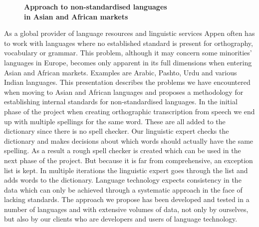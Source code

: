 \documentclass[10pt, a4paper, twopage, headinclude, footinclude, BCOR5mm]{book}
\begin{document}
\newpage

\begin{figure}[t!]
\centering
\large\textbf{Approach to non-standardised languages \\ in Asian and African markets}
\vspace*{0.5cm}
\end{figure}


\begin{table}[t!]
\end{table} 
\noindent
As a global provider of language resources and linguistic services Appen often has to work with languages where no established standard is present for orthography, vocabulary or grammar. This problem, although it may concern some minorities’ languages in Europe, becomes only apparent in its full dimensions when entering Asian and African markets. Examples are Arabic, Pashto, Urdu and various Indian languages. This presentation describes the problems we have encountered when moving to Asian and African languages and proposes a methodology for establishing internal standards for non-standardised languages. In the initial phase of the project when creating orthographic transcription from speech we end up with multiple spellings for the same word. These are all added to the dictionary since there is no spell checker. Our linguistic expert checks the dictionary and makes decisions about which words should actually have the same spelling. As a result a rough spell checker is created which can be used in the next phase of the project. But because it is far from comprehensive, an exception list is kept. In multiple iterations the linguistic expert goes through the list and adds words to the dictionary. Language technology expects consistency in the data which can only be achieved through a systematic approach in the face of lacking standards. The approach we propose has been developed and tested in a number of languages and with extensive volumes of data, not only by ourselves, but also by our clients who are developers and users of language technology.   
\end{document}
